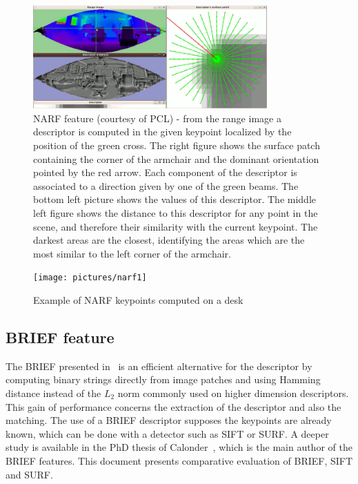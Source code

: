 \begin{figure}[H]
\centering
\includegraphics[width=0.8\textwidth]{figures/narf_descriptor_visualization}
\caption{NARF feature (courtesy of PCL) - from the range image a descriptor is computed in the given keypoint localized by the position of the green cross. The right figure shows the surface patch containing the corner of the armchair and the dominant orientation pointed by the red arrow. Each component of the descriptor is associated to a direction given by one of the green beams. The bottom left picture shows the values of this descriptor. The middle left figure shows the distance to this descriptor for any point in the scene, and therefore their similarity with the current keypoint. The darkest areas are the closest, identifying the areas which are the most similar to the left corner of the armchair.}
\end{figure}

\begin{figure}[H]
\centering
\texttt{[image: pictures/narf1]}
\caption{Example of NARF keypoints computed on a desk}
\end{figure}

\subsection{BRIEF feature}

The \gls{BRIEF} presented in~\cite{Calonder10-brief} is an efficient alternative for the descriptor by computing  binary strings directly from image patches and using Hamming distance instead of the $L_2$ norm commonly used on higher dimension descriptors. This gain of performance concerns the extraction of the descriptor and also the matching. The use of a \gls{BRIEF} descriptor supposes the keypoints are already known, which can be done with a detector such as \gls{SIFT} or \gls{SURF}. A deeper study is available in the PhD thesis of Calonder~\cite{Calonder10_PhD}, which is the main author of the \gls{BRIEF} features. This document presents comparative evaluation of \gls{BRIEF}, \gls{SIFT} and \gls{SURF}.

